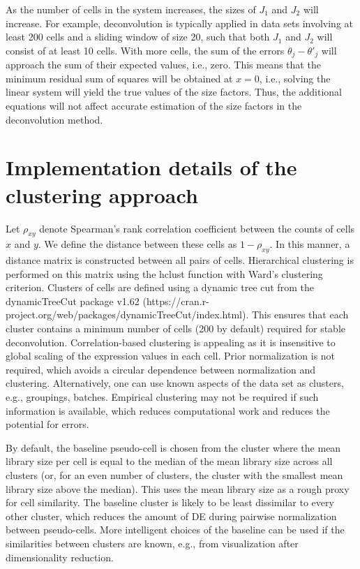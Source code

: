 \documentclass{article}
\begin{document}
As the number of cells in the system increases, the sizes of $J_1$ and $J_2$ will increase. 
For example, deconvolution is typically applied in data sets involving at least 200 cells and a sliding window of size 20, such that both $J_1$ and $J_2$ will consist of at least 10 cells.
With more cells, the sum of the errors $\theta_j - \theta'_j$ will approach the sum of their expected values, i.e., zero.
This means that the minimum residual sum of squares will be obtained at $x=0$, i.e., solving the linear system will yield the true values of the size factors.
Thus, the additional equations will not affect accurate estimation of the size factors in the deconvolution method.

\section{Implementation details of the clustering approach}
Let $\rho_{xy}$ denote Spearman's rank correlation coefficient between the counts of cells $x$ and $y$.
We define the distance between these cells as $1-\rho_{xy}$.
In this manner, a distance matrix is constructed between all pairs of cells.
Hierarchical clustering is performed on this matrix using the hclust function with Ward's clustering criterion.
Clusters of cells are defined using a dynamic tree cut from the dynamicTreeCut package v1.62 ({https://cran.r-project.org/web/packages/dynamicTreeCut/index.html}).
This ensures that each cluster contains a minimum number of cells (200 by default) required for stable deconvolution.
Correlation-based clustering is appealing as it is insensitive to global scaling of the expression values in each cell.
Prior normalization is not required, which avoids a circular dependence between normalization and clustering.
Alternatively, one can use known aspects of the data set as clusters, e.g., groupings, batches.
Empirical clustering may not be required if such information is available, which reduces computational work and reduces the potential for errors.


By default, the baseline pseudo-cell is chosen from the cluster where the mean library size per cell is equal to the median of the mean library size across all clusters
    (or, for an even number of clusters, the cluster with the smallest mean library size above the median).
This uses the mean library size as a rough proxy for cell similarity.
The baseline cluster is likely to be least dissimilar to every other cluster, which reduces the amount of DE during pairwise normalization between pseudo-cells.
More intelligent choices of the baseline can be used if the similarities between clusters are known, e.g., from visualization after dimensionality reduction.
\end{document}
